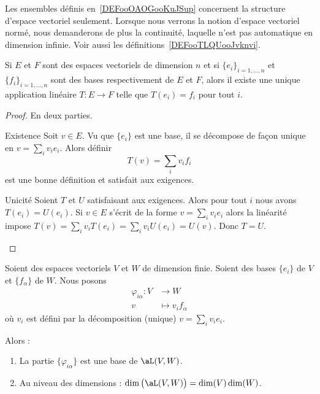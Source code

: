\begin{remark}
    Les ensembles définis en~\ref{DEFooOAOGooKuJSup} concernent la structure d'espace vectoriel seulement. Lorsque nous verrons la notion d'espace vectoriel normé, nous demanderons de plus la continuité, laquelle n'est pas automatique en dimension infinie. Voir aussi les définitions~\ref{DEFooTLQUooJvknvi}.
\end{remark}

\begin{proposition}
    Si \( E\) et \( F\) sont des espaces vectoriels de dimension \( n\) et si \( \{ e_i \}_{i=1,\ldots, n}\) et \( \{ f_i \}_{i=1,\ldots, n}\) sont des bases respectivement de \( E\) et \( F\), alors il existe une unique application linéaire \( T\colon E\to F\) telle que \( T(e_i)=f_i\) pour tout \( i\).
\end{proposition}

\begin{proof}
    En deux parties.\begin{subproof}
        \item[Existence]
            Soit \( v\in E\). Vu que \( \{ e_i \}\) est une base, il se décompose de façon unique en \( v=\sum_iv_ie_i\). Alors définir
            \begin{equation}
                T(v)=\sum_iv_if_i
            \end{equation}
            est une bonne définition et satisfait aux exigences.
        \item[Unicité]
            Soient \( T\) et \( U\) satisfaisant aux exigences. Alors pour tout \( i\) nous avons \( T(e_i)=U(e_i)\). Si \( v\in E\) s'écrit de la forme \( v=\sum_iv_ie_i\) alors la linéarité impose \( T(v)=\sum_iv_iT(e_i)=\sum_iv_iU(e_i)=U(v)\). Donc \( T = U\).
    \end{subproof}
\end{proof}

\begin{lemma}       \label{LEMooJXFIooKDzRWR}
    Soient des espaces vectoriels \( V\) et \( W\) de dimension finie. Soient des bases \( \{e_i\}\) de \( V\) et \( \{f_{\alpha}\}\) de \( W\). Nous posons
    \begin{equation}
        \begin{aligned}
            \varphi_{i\alpha}\colon V&\to W \\
            v&\mapsto v_if_{\alpha} 
        \end{aligned}
    \end{equation}
    où \( v_i\) est défini par la décomposition (unique) \( v=\sum_iv_ie_i\). 

    Alors :
    \begin{enumerate}
        \item
            La partie \( \{\varphi_{i\alpha}\} \) est une base de \( \aL(V,W)\).
        \item       \label{ITEMooPMLWooNbTyJI}
            Au niveau des dimensions : \( \dim\big( \aL(V,W) \big)=\dim(V)\dim(W)\).
    \end{enumerate}
\end{lemma}

